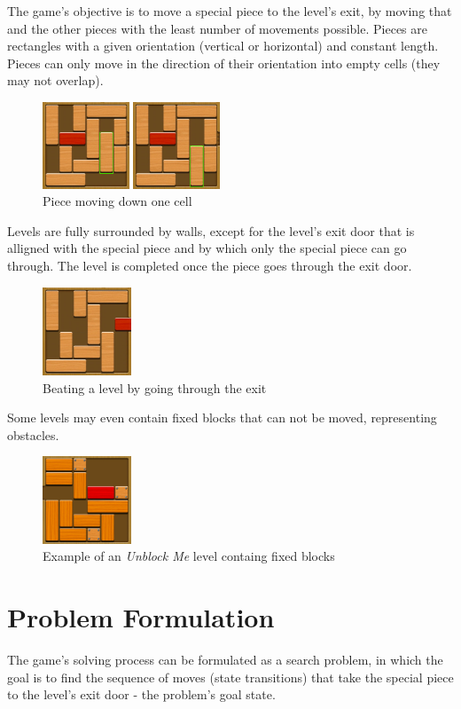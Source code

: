 \documentclass[conference]{IEEEtran}
\begin{document}
The game's objective is to move a special piece to the level's exit, by moving that and the other pieces with the least number of movements possible. Pieces are rectangles with a given orientation (vertical or horizontal) and constant length. Pieces can only move in the direction of their orientation into empty cells (they may not overlap).  

\begin{figure}[H]
    \centerline{\includegraphics[width=200px]{img2.png}}
    \caption{Piece moving down one cell}
\end{figure}

Levels are fully surrounded by walls, except for the level's exit door that is alligned with the special piece and by which only the special piece can go through. The level is completed once the piece goes through the exit door.
 
\begin{figure}[H]
    \centerline{\includegraphics[width=100px]{img3.png}}
    \caption{Beating a level by going through the exit}
    \label{img:final_state}
\end{figure}

Some levels may even contain fixed blocks that can not be moved, representing obstacles.
 
\begin{figure}[H]
    \centerline{\includegraphics[width=100px]{img4.png}}
    \caption{Example of an \textit{Unblock Me} level containg fixed blocks}
\end{figure}

\section{Problem Formulation}
The game's solving process can be formulated as a search problem, in which the goal is to find the sequence of moves (state transitions) that take the special piece to the level's exit door - the problem's goal state. 
\end{document}
